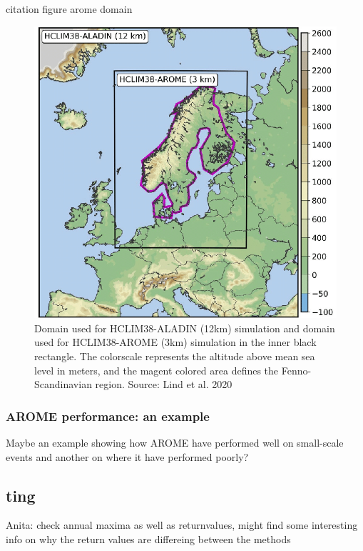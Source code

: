 \cite{lind_arome} citation figure arome domain 
\begin{figure}
    \centering
    \includegraphics[scale=0.4]{figures/arome_domain.png}
    \caption{Domain used for HCLIM38-ALADIN (12km) simulation and domain used for HCLIM38-AROME (3km) simulation in the inner black rectangle. The colorscale represents the altitude above mean sea level in meters, and the magent colored area defines the Fenno-Scandinavian region. Source: Lind et al. 2020 \cite{lind_arome}}
    \label{fig:arome_domain}
\end{figure}

\subsubsection{AROME performance: an example}
Maybe an example showing how AROME have performed well on small-scale events and another on where it have performed poorly? 

\subsection{ting}

Anita: check annual maxima as well as returnvalues, might find some interesting info on why the return values are differeing between the methods